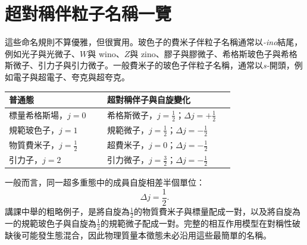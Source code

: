 \begin{classroomqa}
\end{classroomqa}

\begin{classroomqa}
\end{classroomqa}

\section{超對稱伴粒子名稱一覽}

這些命名規則不算優雅，但很實用。玻色子的費米子伴粒子名稱通常以\emph{-ino}結尾，例如光子與光微子、\(W\)與 wino、\(Z\)與 zino、膠子與膠微子、希格斯玻色子與希格斯微子、引力子與引力微子。一般費米子的玻色子伴粒子名稱，通常以\emph{s-}開頭，例如電子與超電子、夸克與超夸克。

\begin{center}
\begin{tabular}{@{}>{\raggedright\arraybackslash}p{0.40\linewidth}>{\raggedright\arraybackslash}p{0.52\linewidth}@{}}
\toprule
普通態 & 超對稱伴子與自旋變化\\
\midrule
標量希格斯場，\(j=0\) & 希格斯微子，\(j=\tfrac12\)；\(\Delta j=+\tfrac12\)\\
規範玻色子，\(j=1\) & 規範微子，\(j=\tfrac12\)；\(\Delta j=-\tfrac12\)\\
物質費米子，\(j=\tfrac12\) & 超費米子，\(j=0\)；\(\Delta j=-\tfrac12\)\\
引力子，\(j=2\) & 引力微子，\(j=\tfrac32\)；\(\Delta j=-\tfrac12\)\\
\bottomrule
\end{tabular}
\end{center}

一般而言，同一超多重態中的成員自旋相差半個單位：
\begin{equation}
\Delta j=\frac12.
\end{equation}
講課中舉的粗略例子，是將自旋為\(\tfrac12\)的物質費米子與標量配成一對，以及將自旋為一的規範玻色子與自旋為\(\tfrac12\)的規範微子配成一對。完整的相互作用模型在對稱性破缺後可能發生態混合，因此物理質量本徵態未必沿用這些最簡單的名稱。

